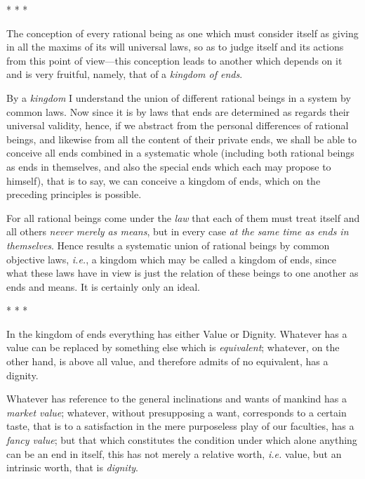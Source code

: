 \begin{center}* * *\end{center}

The conception of every rational being as one which must
consider itself as giving in all the maxims of its will universal
laws, so as to judge itself and its actions from this point of
view---this conception leads to another which depends on it and is
very fruitful, namely, that of a \textit{kingdom of ends}.

By a \textit{kingdom} I understand the union of different rational
beings in a system by common laws. Now since it is by laws that ends
are determined as regards their universal validity, hence, if we
abstract from the personal differences of rational beings, and
likewise from all the content of their private ends, we shall be able
to conceive all ends combined in a systematic whole (including both
rational beings as ends in themselves, and also the special ends which
each may propose to himself), that is to say, we can conceive a
kingdom of ends, which on the preceding principles is possible.

For all rational beings come under the \textit{law} that each
of them must treat itself and all others \textit{never merely as
means}, but in every case \textit{at the same time as ends in
themselves}. Hence results a systematic union of rational beings by
common objective laws, \textit{i.e.}, a kingdom which may be called a
kingdom of ends, since what these laws have in view is just the
relation of these beings to one another as ends and means. It is
certainly only an ideal.

\begin{center}* * *\end{center}

In the kingdom of ends everything has either Value or
Dignity. Whatever has a value can be replaced by something else which
is \textit{equivalent}; whatever, on the other hand, is above all
value, and therefore admits of no equivalent, has a dignity.

Whatever has reference to the general inclinations and wants of
mankind has a \textit{market value}; whatever, without presupposing a
want, corresponds to a certain taste, that is to a satisfaction in the
mere purposeless play of our faculties, has a \textit{fancy value};
but that which constitutes the condition under which alone anything
can be an end in itself, this has not merely a relative worth,
\textit{i.e.} value, but an intrinsic worth, that is \textit{dignity}.

